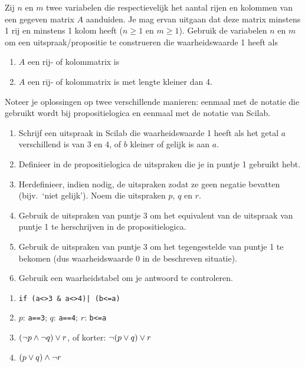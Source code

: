 \begin{oef}
 Zij $n$ en $m$ twee variabelen die respectievelijk het aantal rijen en kolommen van een gegeven matrix $A$ aanduiden. Je mag ervan uitgaan dat deze matrix minstens 1 rij en minstens 1 kolom heeft ($n \geqslant 1$ en $m\geqslant 1$). Gebruik de variabelen $n$ en $m$ om een uitspraak/propositie te construeren die waarheidswaarde 1 heeft als

\begin{enumerate}
\item $A$ een rij- of kolommatrix is
\item  $A$ een rij- of kolommatrix is met lengte kleiner dan 4.
\end{enumerate}
Noteer je oplossingen op twee verschillende manieren: eenmaal met de notatie die gebruikt wordt bij propositielogica en eenmaal met de notatie van Scilab.

\end{oef}

\begin{oef}
\begin{enumerate}
\item  Schrijf een uitspraak in Scilab die waarheidswaarde 1 heeft als het getal $a$ verschillend is van 3 en 4, of $b$ kleiner of gelijk is aan $a$.
\item Definieer	 in	de	propositielogica	de 	uitspraken	die	je	in	puntje	1 gebruikt	hebt.
\item Herdefinieer,	indien	nodig,	de	 uitspraken	zodat	ze	 geen	negatie 	bevatten	(bijv.\ `niet	gelijk'). Noem die uitspraken $p$, $q$ en $r$.
\item Gebruik	de 	uitspraken	van	puntje	3	om	het	equivalent	van	de uitspraak	van	
puntje	1	te	herschrijven in	de 	propositielogica.
\item Gebruik	de	 uitspraken	van	puntje	3	om	het	tegengestelde	van	puntje	1	te	
bekomen	(dus	waarheidswaarde	0	in	de 	beschreven	situatie).
\item Gebruik	een	waarheidstabel	 om	je	antwoord	te	controleren.
\end{enumerate}
\begin{opl}
\begin{enumerate}
\item \verb+if (a<>3 & a<>4)| (b<=a)+
\item $p$: \texttt{a==3}; $q$: \texttt{a==4}; $r$: \texttt{b<=a}
\item $(\neg p \wedge \neg q)\vee r$, of korter: $\neg(p \vee q) \vee r$
\item $(p\vee q)\wedge \neg r$
\end{enumerate}
\end{opl}
\end{oef}


